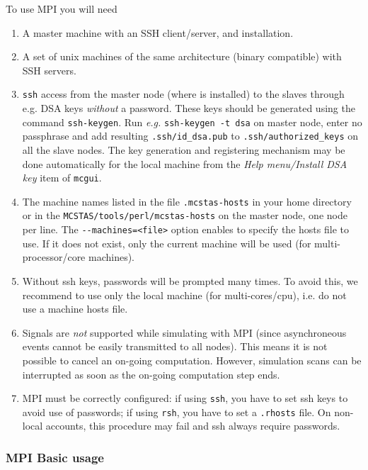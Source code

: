 To use MPI you will need
  \begin{enumerate}
  \item{A master machine with an SSH client/server, and \MCS installation.}
  \item{A set of unix machines of the same architecture (binary compatible) with SSH servers.}
  \item{ \texttt{ssh} access from the master node (where \MCS is
      installed) to the slaves through e.g. DSA keys \emph{without} a
      password. These keys should be generated using the command
      \texttt{ssh-keygen}. Run \emph{e.g.} \texttt{ssh-keygen -t dsa} on
      master node, enter no passphrase and add resulting
      \texttt{.ssh/id\_dsa.pub} to \texttt{.ssh/authorized\_keys}
      on all the slave nodes. The key generation and registering mechanism 
      may be done automatically for the local machine from the 
      \emph{Help menu/Install DSA key} item of \verb+mcgui+.}
  \item{The machine names listed in the file \texttt{.mcstas-hosts} in
      your home directory or in the \texttt{MCSTAS/tools/perl/mcstas-hosts} on
      the master node, one node per line. The \verb'--machines=<file>' option
      enables to specify the hosts file to use. If it does not exist, only 
      the current machine will be used (for multi-processor/core machines).}
  \item{Without ssh keys, passwords will be prompted many times. To avoid this, 
      we recommend to use only the local machine (for multi-cores/cpu), i.e. do
      not use a machine hosts file.}
  \item Signals are \emph{not} supported while simulating with MPI (since
    asynchroneous events cannot be easily transmitted to all nodes). This
    means it is not possible to cancel an on-going computation. However, 
    simulation scans can be interrupted as soon as the on-going computation 
    step ends.
  \item MPI must be correctly configured: if using \verb'ssh', you
    have to set ssh keys to avoid use of passwords; if
    using \verb'rsh', you have to set a \verb'.rhosts' file.
    On non-local accounts, this procedure may fail and ssh always require passwords.
  \end{enumerate}

\subsubsection{MPI Basic usage}


